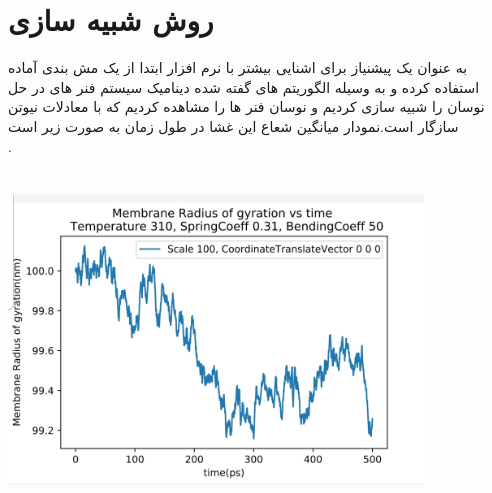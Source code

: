 \documentclass[12pt,onecolumn,a4paper]{report}
\begin{document}
{\section{روش شبیه سازی}
به عنوان یک پیشنیاز برای اشنایی بیشتر با نرم افزار ابتدا از یک مش بندی آماده استفاده کرده و به  وسیله الگوریتم های گفته شده دینامیک سیستم فنر های در حل نوسان را شبیه سازی کردیم و نوسان فنر ها را مشاهده کردیم که با معادلات نیوتن سازگار است.نمودار میانگین شعاع این غشا در طول زمان به صورت زیر است\\.
\begin{center}
\includegraphics[width=11cm, height=9cm]{20210215_142631.jpg}
\end{center}\\

}
\end{document}
